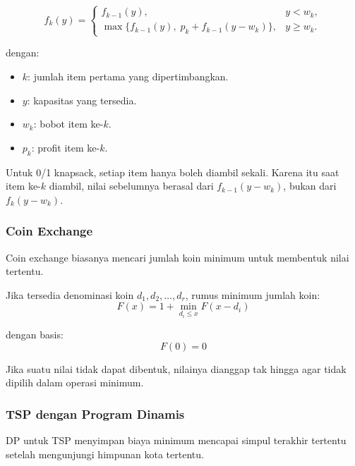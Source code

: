 \begin{equation}
    f_k(y)=
    \begin{cases}
    f_{k-1}(y), & y < w_k,\\
    \max\{f_{k-1}(y),\; p_k+f_{k-1}(y-w_k)\}, & y\ge w_k.
    \end{cases}
    \label{eq:dp-knapsack}
\end{equation}

dengan:
\begin{itemize}
    \item $k$: jumlah item pertama yang dipertimbangkan.
    \item $y$: kapasitas yang tersedia.
    \item $w_k$: bobot item ke-$k$.
    \item $p_k$: profit item ke-$k$.
\end{itemize}

Untuk 0/1 knapsack, setiap item hanya boleh diambil sekali. Karena itu saat item ke-$k$ diambil, nilai sebelumnya berasal dari $f_{k-1}(y-w_k)$, bukan dari $f_k(y-w_k)$.

\subsubsection{Coin Exchange}

\begin{jawab}
Coin exchange biasanya mencari jumlah koin minimum untuk membentuk nilai tertentu.
\end{jawab}

Jika tersedia denominasi koin $d_1,d_2,\ldots,d_r$, rumus minimum jumlah koin:
\begin{equation}
    F(x)=1+\min_{d_i\le x} F(x-d_i)
    \label{eq:dp-coin-exchange}
\end{equation}

dengan basis:
\begin{equation}
    F(0)=0
    \label{eq:dp-coin-base}
\end{equation}

Jika suatu nilai tidak dapat dibentuk, nilainya dianggap tak hingga agar tidak dipilih dalam operasi minimum.

\subsubsection{TSP dengan Program Dinamis}

\begin{jawab}
DP untuk TSP menyimpan biaya minimum mencapai simpul terakhir tertentu setelah mengunjungi himpunan kota tertentu.
\end{jawab}

